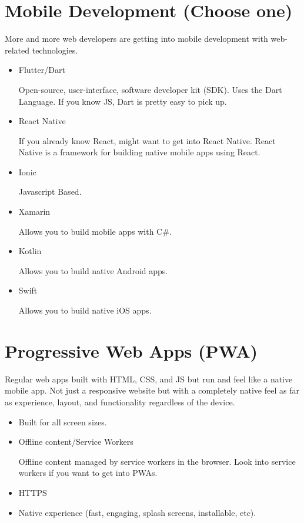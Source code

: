 \section{Mobile Development \small{(Choose one)}}
More and more web developers are getting into mobile development with web-related technologies.

\begin{itemize}
    \item Flutter/Dart
    
    Open-source, user-interface, software developer kit (SDK). Uses the Dart Language. If you know JS, Dart is pretty easy to pick up.
    \item React Native
    
    If you already know React, might want to get into React Native. React Native is a framework for building native mobile apps using React.
    \item Ionic
    
    Javascript Based.
    \item Xamarin
    
    Allows you to build mobile apps with C\#.
    \item Kotlin
    
    Allows you to build native Android apps.
    \item Swift
    
    Allows you to build native iOS apps.
\end{itemize}

\section{Progressive Web Apps (PWA)}

Regular web apps built with HTML, CSS, and JS but run and feel like a native mobile app. Not just a responsive website but with a completely native feel as far as experience, layout, and functionality regardless of the device.

\begin{itemize}
    \item Built for all screen sizes.
    \item Offline content/Service Workers
    
    Offline content managed by service workers in the browser. Look into service workers if you want to get into PWAs.
    \item HTTPS
    \item Native experience (fast, engaging, splash screens, installable, etc).
\end{itemize}

